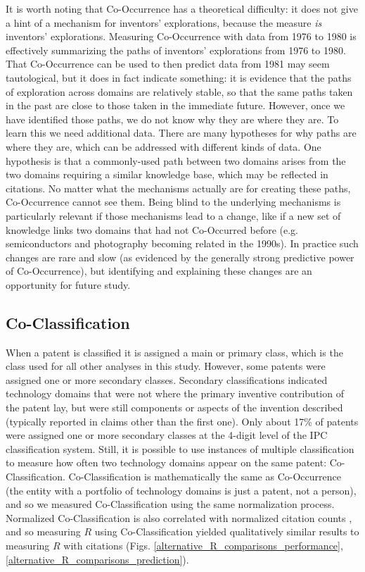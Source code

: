 \documentclass{dsj}
\begin{document}
It is worth noting that Co-Occurrence has a theoretical difficulty: it does not give a hint of a mechanism for inventors' explorations, because the measure \textit{is} inventors' explorations. Measuring Co-Occurrence with data from 1976 to 1980 is effectively summarizing the paths of inventors' explorations from 1976 to 1980. That Co-Occurrence can be used to then predict data from 1981 may seem tautological, but it does in fact indicate something: it is evidence that the paths of exploration across domains are relatively stable, so that the same paths taken in the past are close to those taken in the immediate future. However, once we have identified those paths, we do not know why they are where they are. To learn this we need additional data. There are many hypotheses for why paths are where they are, which can be addressed with different kinds of data. One hypothesis is that a commonly-used path between two domains arises from the two domains requiring a similar knowledge base, which may be reflected in citations. No matter what the mechanisms actually are for creating these paths, Co-Occurrence cannot see them. Being blind to the underlying mechanisms is particularly relevant if those mechanisms lead to a change, like if a new set of knowledge links two domains that had not Co-Occurred before (e.g. semiconductors and photography becoming related in the 1990s). In practice such changes are rare and slow (as evidenced by the generally strong predictive power of Co-Occurrence), but identifying and explaining these changes are an opportunity for future study.


\subsection{Co-Classification}
When a patent is classified it is assigned a main or primary class, which is the class used for all other analyses in this study. However, some patents were assigned one or more secondary classes. Secondary classifications indicated technology domains that were not where the primary inventive contribution of the patent lay, but were still components or aspects of the invention described (typically reported in claims other than the first one). Only about 17\% of patents were assigned one or more secondary classes at the 4-digit level of the IPC classification system. Still, it is possible to use instances of multiple classification to measure how often two technology domains appear on the same patent: Co-Classification. 
Co-Classification is mathematically the same as Co-Occurrence (the entity with a portfolio of technology domains is just a patent, not a person), and so we measured Co-Classification using the same normalization process. Normalized Co-Classification is also correlated with normalized citation counts \cite{Alstott2017}, and so measuring $R$ using Co-Classification yielded qualitatively similar results to measuring $R$ with citations (Figs. \ref{alternative_R_comparisons_performance},\ref{alternative_R_comparisons_prediction}).
\end{document}
